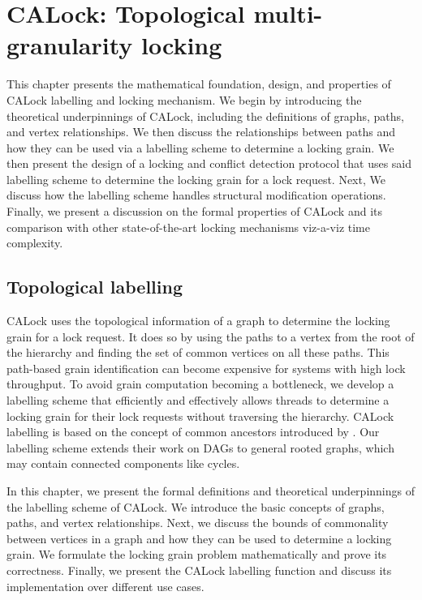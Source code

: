 

\chapter{CALock: Topological multi-granularity locking} \label{chap:CALock}

This chapter presents the mathematical foundation, design, and properties of CALock labelling and locking mechanism. We begin by introducing the theoretical underpinnings of CALock, including the definitions of graphs, paths, and vertex relationships. We then discuss the relationships between paths and how they can be used via a labelling scheme to determine a locking grain. We then present the design of a locking and conflict detection protocol that uses said labelling scheme to determine the locking grain for a lock request. Next, We discuss how the labelling scheme handles structural modification operations. Finally, we present a discussion on the formal properties of CALock and its comparison with other state-of-the-art locking mechanisms viz-a-viz time complexity.


\section{Topological labelling} \label{chap:theory}

CALock uses the topological information of a graph to determine the locking grain for a lock request. It does so by using the paths to a vertex from the root of the hierarchy and finding the set of common vertices on all these paths. This path-based grain identification can become expensive for systems with high lock throughput. To avoid grain computation becoming a bottleneck, we develop a labelling scheme that efficiently and effectively allows threads to determine a locking grain for their lock requests without traversing the hierarchy. CALock labelling is based on the concept of common ancestors introduced by \citet{fischer2010new}. Our labelling scheme extends their work on DAGs to general rooted graphs, which may contain connected components like cycles. 

In this chapter, we present the formal definitions and theoretical underpinnings of the labelling scheme of CALock.
We introduce the basic concepts of graphs, paths, and vertex relationships.
Next, we discuss the bounds of commonality between vertices in a graph and how they can be used to determine a locking grain. We formulate the locking grain problem mathematically and prove its correctness. Finally, we present the CALock labelling function and discuss its implementation over different use cases.

